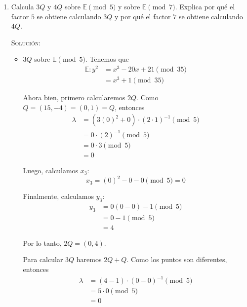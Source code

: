 \documentclass[letterpaper,11pt]{article}
\begin{document}
\begin{enumerate}
\begin{enumerate}
        \item Calcula $3Q$ y $4Q$ sobre $\mathbb{E} \pmod{5}$ y sobre 
        $\mathbb{E} \pmod{7}$. Explica por qué el factor $5$ se obtiene 
        calculando $3Q$ y por qué el factor $7$ se obtiene calculando $4Q$.
        
        \textsc{Solución:}
        \begin{itemize}
            \item $3Q$ sobre $\mathbb{E} \pmod{5}$. Tenemos que  
            \begin{align*}
                \mathbb{E}: y^2 
                &= x^3 - 20x + 21 \pmod{35} \\ 
                &= x^3 + 1 \pmod{35}
            \end{align*}

            Ahora bien, primero calcularemos $2Q$. Como $Q = (15, -4) = (0, 1) 
            = Q$, entonces
            \begin{align*}
                \lambda 
                &= (3(0)^2 + 0) \cdot (2 \cdot 1)^{-1} \pmod{5} \\ 
                &= 0 \cdot (2)^{-1} \pmod{5} \\
                &= 0 \cdot 3 \pmod{5} \\ 
                &= 0
            \end{align*}

            Luego, calculamos $x_3$:
            \begin{equation*}
                x_3 = (0)^2 - 0 - 0 \pmod{5} = 0
            \end{equation*}

            Finalmente, calculamos $y_3$:
            \begin{align*}
                y_3
                &= 0(0 - 0) - 1 \pmod{5} \\ 
                &= 0 - 1 \pmod{5} \\ 
                &= 4
            \end{align*}

            Por lo tanto, $2Q = (0, 4)$.

            Para calcular $3Q$ haremos $2Q + Q$. Como los puntos son diferentes,
            entonces
            \begin{align*}
                \lambda 
                &= (4 - 1) \cdot (0 - 0)^{-1} \pmod{5} \\ 
                &= 5 \cdot 0 \pmod{5} \\ 
                &= 0
            \end{align*}


\end{itemize}
\end{enumerate}
\end{enumerate}
\end{document}
